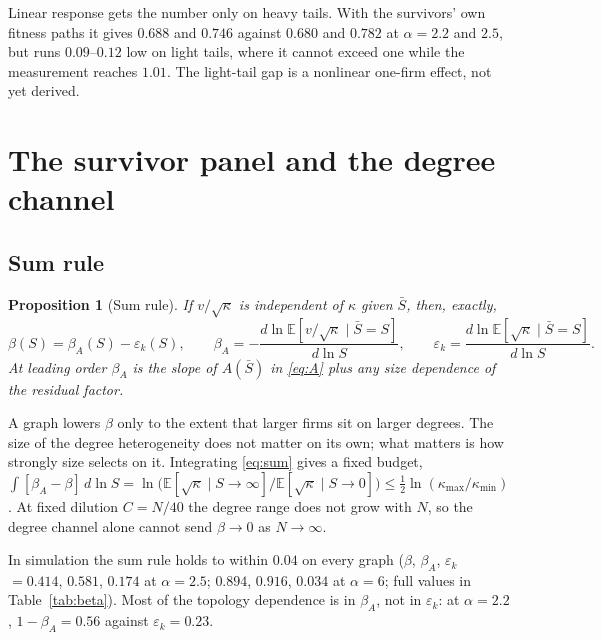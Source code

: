 \documentclass[11pt]{article}
\newcommand{\E}{\mathbb E}
\newtheorem{proposition}{Proposition}
\begin{document}
Linear response gets the number only on heavy tails.  With the survivors' own fitness paths it
gives $0.688$ and $0.746$ against $0.680$ and $0.782$ at $\alpha=2.2$ and $2.5$, but runs
$0.09$--$0.12$ low on light tails, where it cannot exceed one while the measurement reaches
$1.01$.  The light-tail gap is a nonlinear one-firm effect, not yet derived.

\section{The survivor panel and the degree channel}
\label{sec:survivor}

\subsection{Sum rule}
\label{sec:sumrule}

\begin{proposition}[Sum rule]\label{prop:sum}
If $v/\sqrt\kappa$ is independent of $\kappa$ given $\bar S$, then, exactly,
\begin{equation}
  \beta(S)=\beta_A(S)-\varepsilon_k(S),\qquad
  \beta_A=-\frac{d\ln\E[v/\sqrt\kappa\mid\bar S=S]}{d\ln S},\qquad
  \varepsilon_k=\frac{d\ln\E[\sqrt\kappa\mid\bar S=S]}{d\ln S}.
  \label{eq:sum}
\end{equation}
At leading order $\beta_A$ is the slope of $A(\bar S)$ in \eqref{eq:A} plus any size dependence of
the residual factor.
\end{proposition}
A graph lowers $\beta$ only to the extent that larger firms sit on larger degrees.  The size of
the degree heterogeneity does not matter on its own; what matters is how strongly size selects on
it.  Integrating \eqref{eq:sum} gives a fixed budget,
$\int[\beta_A-\beta]\,d\ln S=\ln\bigl(\E[\sqrt\kappa\mid S\to\infty]/\E[\sqrt\kappa\mid S\to0]\bigr)\le
\tfrac12\ln(\kappa_{\max}/\kappa_{\min})$.  At fixed dilution $C=N/40$ the degree range does not grow
with $N$, so the degree channel alone cannot send $\beta\to0$ as $N\to\infty$.

In simulation the sum rule holds to within $0.04$ on every graph ($\beta$, $\beta_A$, $\varepsilon_k$
$=0.414$, $0.581$, $0.174$ at $\alpha=2.5$; $0.894$, $0.916$, $0.034$ at $\alpha=6$; full values in
Table~\ref{tab:beta}).  Most of the topology dependence is in $\beta_A$, not in $\varepsilon_k$: at
$\alpha=2.2$, $1-\beta_A=0.56$ against $\varepsilon_k=0.23$.
\end{document}
